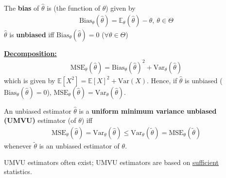 \documentclass[11pt]{elegantbook}
\begin{document}
\begin{definition}[Bias]
    \normalfont
    The \textbf{bias} of $\hat{\theta}$ is (the function of $\theta$) given by
    \begin{equation}
        \begin{aligned}
            \text{Bias}_\theta(\hat{\theta})=\mathbb{E}_\theta(\hat{\theta})-\theta,\ \theta\in\Theta
        \end{aligned}
        \nonumber
    \end{equation}
    $\hat{\theta}$ is \textbf{unbiased} iff $\text{Bias}_\theta(\hat{\theta})=0$ ($\forall \theta\in \Theta$)
\end{definition}
\textbf{\underline{Decomposition:}}
\begin{equation}
    \begin{aligned}
        \text{MSE}_\theta(\hat{\theta})=\text{Bias}_\theta(\hat{\theta})^2+\text{Var}_\theta(\hat{\theta})
    \end{aligned}
    \nonumber
\end{equation}
which is given by $\mathbb{E}[X^2]=\mathbb{E}[X]^2+\text{Var}(X)$. Hence, if $\hat{\theta}$ is unbiased ($\text{Bias}_\theta(\hat{\theta})=0$), $\text{MSE}_\theta(\hat{\theta})=\text{Var}_\theta(\hat{\theta})$.

\begin{definition}
    \normalfont
    An unbiased estimator $\hat{\theta}$ is a \textbf{uniform minimum variance unbiased (UMVU)} estimator (of $\theta$) iff
    \begin{equation}
        \begin{aligned}
            \text{MSE}_\theta(\hat{\theta})=\text{Var}_\theta(\hat{\theta})\leq \text{Var}_\theta(\tilde{\theta})=\text{MSE}_\theta(\tilde{\theta})
        \end{aligned}
        \nonumber
    \end{equation}
    whenever $\tilde{\theta}$ is an unbiased estimator of $\theta$.
\end{definition}
\begin{remark}
    UMVU estimators often exist; UMVU estimators are based on \underline{sufficient} statistics.
\end{remark}
\end{document}
